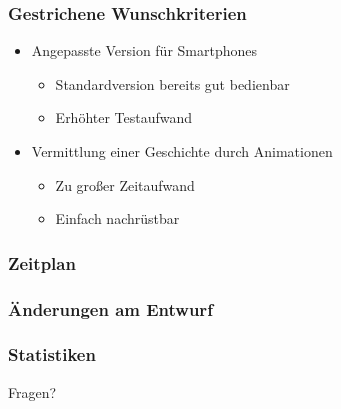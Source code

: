 \documentclass[t]{beamer}
\begin{document}
\begin{frame}
	\frametitle{Gestrichene Wunschkriterien}
	\begin{itemize}
		\item Angepasste Version für Smartphones
			\begin{itemize}
				\item Standardversion bereits gut bedienbar
				\item Erhöhter Testaufwand
			\end{itemize}
		\pause
		\item Vermittlung einer Geschichte durch Animationen
			\begin{itemize}
				\item Zu großer Zeitaufwand
				\item Einfach nachrüstbar
			\end{itemize}
	\end{itemize}
\end{frame}

\begin{frame}
	\frametitle{Zeitplan}
\end{frame}

\begin{frame}
	\frametitle{Änderungen am Entwurf}
\end{frame}

\begin{frame}
	\frametitle{Statistiken}
\end{frame}

\begin{frame}[c]
	\begin{center}
		\Huge
		Fragen?
	\end{center}
\end{frame}
\end{document}

